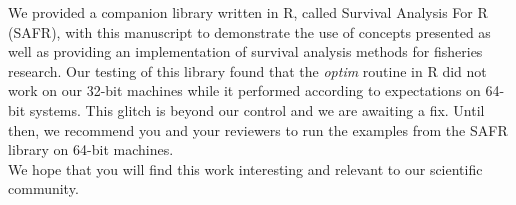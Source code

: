 \documentclass[11pt]{article}
\begin{document}
\begin{spacing}{1.2}




We provided a companion library written in R, called Survival Analysis For R (SAFR), with this manuscript to demonstrate the use of concepts presented as well as providing an implementation of survival analysis methods for fisheries research. Our testing of this library found that the {\it optim} routine in R did not work on our 32-bit machines while it performed according to expectations on 64-bit systems. This glitch is beyond our control and we are awaiting a fix. Until then, we recommend you and your reviewers to run the examples from the SAFR library on 64-bit machines.\\ 


We hope that you will find this work interesting and relevant to our scientific community. \\


\end{spacing}
\end{document}
